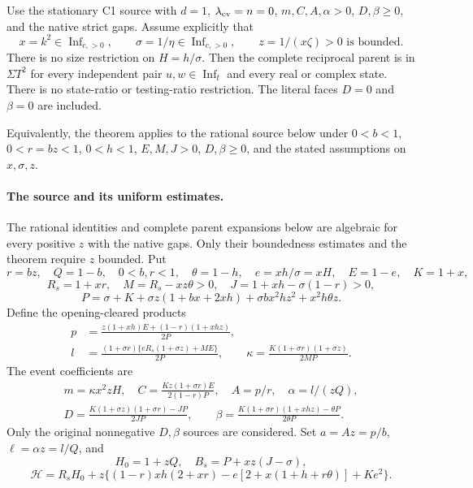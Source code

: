 \begin{theorem}\label{thm:c1-unification-bounded-z-all-H}
Use the stationary C1 source with $d=1$, $\lambda_{\rm ev}=n=0$,
$m,C,A,\alpha>0$, $D,\beta\ge0$, and the native strict gaps. Assume
explicitly that
\[
 x=k^2\in\operatorname{Inf}_{c,>0},\qquad
 \sigma=1/\eta\in\operatorname{Inf}_{c,>0},\qquad
 z=1/(x\zeta)>0\text{ is bounded}.
\]
There is no size restriction on $H=h/\sigma$. Then the complete
reciprocal parent is in $\Sigma T^2$ for every independent pair
$u,w\in\operatorname{Inf}_t$ and every real or complex state.
There is no state-ratio or testing-ratio restriction. The literal
faces $D=0$ and $\beta=0$ are included.

Equivalently, the theorem applies to the rational source below under
$0<b<1$, $0<r=bz<1$, $0<h<1$, $E,M,J>0$, $D,\beta\ge0$,
and the stated assumptions on $x,\sigma,z$.
\end{theorem}

\paragraph{The source and its uniform estimates.}
The rational identities and complete parent expansions below are
algebraic for every positive $z$ with the native gaps. Only their
boundedness estimates and the theorem require $z$ bounded.
Put
\[
 r=bz,\quad Q=1-b,\quad 0<b,r<1,\quad \theta=1-h,\quad
 e=xh/\sigma=xH,\quad E=1-e,\quad K=1+x,
\]
\[
 R_s=1+xr,\quad M=R_s-xz\theta>0,\quad
 J=1+xh-\sigma(1-r)>0,
\]
\[
 P=\sigma+K+\sigma z(1+bx+2xh)
              +\sigma bx^2hz^2+x^2h\theta z.
\]
Define the opening-cleared products
\[
\begin{split}
 p&=\frac{z(1+xh)E+(1-r)(1+xhz)}{2P},\\
 l&=\frac{(1+\sigma r)\{eR_s(1+\sigma z)+ME\}}{2P},\qquad
 \kappa=\frac{K(1+\sigma r)(1+\sigma z)}{2MP}.
\end{split}
\]
The event coefficients are
\[
\begin{gathered}
 m=\kappa x^2zH,\quad
 C=\frac{Kz(1+\sigma r)E}{2(1-r)P},\quad
 A=p/r,\quad \alpha=l/(zQ),\\
 D=\frac{K(1+\sigma z)(1+\sigma r)-JP}{2JP},\qquad
 \beta=\frac{K(1+\sigma r)(1+xhz)-\theta P}{2\theta P}.
\end{gathered}\tag{P1}\label{eq:c1-eta-large-source}
\]
Only the original nonnegative $D,\beta$ sources are considered.  Set
$a=Az=p/b$, $\ell=\alpha z=l/Q$, and
\[
 H_0=1+zQ,\quad B_s=P+xz(J-\sigma),
\]
\[
 \mathcal H=R_sH_0+z\{(1-r)xh(2+xr)
       -e[2+x(1+h+r\theta)]+Ke^2\}.
\]

